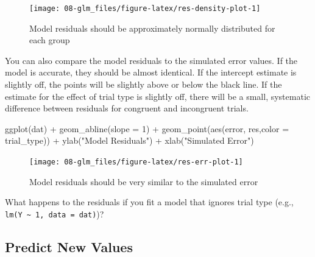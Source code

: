 \documentclass[
  oneside]{book}
\newenvironment{Shaded}{\begin{snugshade}}{\end{snugshade}}
\newcommand{\AttributeTok}[1]{\textcolor[rgb]{0.77,0.63,0.00}{#1}}
\newcommand{\DecValTok}[1]{\textcolor[rgb]{0.00,0.00,0.81}{#1}}
\newcommand{\FunctionTok}[1]{\textcolor[rgb]{0.00,0.00,0.00}{#1}}
\newcommand{\NormalTok}[1]{#1}
\newcommand{\SpecialCharTok}[1]{\textcolor[rgb]{0.00,0.00,0.00}{#1}}
\newcommand{\StringTok}[1]{\textcolor[rgb]{0.31,0.60,0.02}{#1}}
\begin{document}
\begin{figure}

{\centering \texttt{[image: 08-glm\_files/figure-latex/res-density-plot-1]} 

}

\caption{Model residuals should be approximately normally distributed for each group}\label{fig:res-density-plot}
\end{figure}

You can also compare the model residuals to the simulated error values. If the model is accurate, they should be almost identical. If the intercept estimate is slightly off, the points will be slightly above or below the black line. If the estimate for the effect of trial type is slightly off, there will be a small, systematic difference between residuals for congruent and incongruent trials.

\begin{Shaded}
\begin{Highlighting}[]
\FunctionTok{ggplot}\NormalTok{(dat) }\SpecialCharTok{+}
  \FunctionTok{geom\_abline}\NormalTok{(}\AttributeTok{slope =} \DecValTok{1}\NormalTok{) }\SpecialCharTok{+}
  \FunctionTok{geom\_point}\NormalTok{(}\FunctionTok{aes}\NormalTok{(error, res,}\AttributeTok{color =}\NormalTok{ trial\_type)) }\SpecialCharTok{+}
  \FunctionTok{ylab}\NormalTok{(}\StringTok{"Model Residuals"}\NormalTok{) }\SpecialCharTok{+}
  \FunctionTok{xlab}\NormalTok{(}\StringTok{"Simulated Error"}\NormalTok{)}
\end{Highlighting}
\end{Shaded}

\begin{figure}

{\centering \texttt{[image: 08-glm\_files/figure-latex/res-err-plot-1]} 

}

\caption{Model residuals should be very similar to the simulated error}\label{fig:res-err-plot}
\end{figure}

\begin{try}
What happens to the residuals if you fit a model that ignores trial type (e.g., \texttt{lm(Y\ \textasciitilde{}\ 1,\ data\ =\ dat)})?

\end{try}

\hypertarget{predict}{%
\subsection{Predict New Values}\label{predict}}
\end{document}
